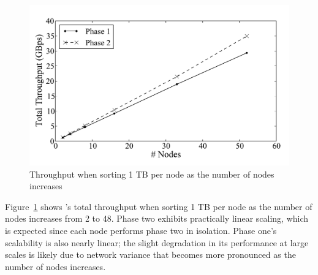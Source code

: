 \begin{figure}[T]
    \centering
    \includegraphics[width=\columnwidth]{tritonsort/graphs/scalability.pdf}

    \caption{\label{fig:scalability}Throughput when sorting 1 TB per node as the number of nodes increases}
\end{figure}

Figure~\ref{fig:scalability} shows \tritonsort's total throughput when sorting
1 TB per node as the number of nodes increases from 2 to 48. Phase two exhibits
practically linear scaling, which is expected since each node performs phase
two in isolation.  Phase one's scalability is also nearly linear; the slight
degradation in its performance at large scales is likely due to network
variance that becomes more pronounced as the number of nodes increases.

